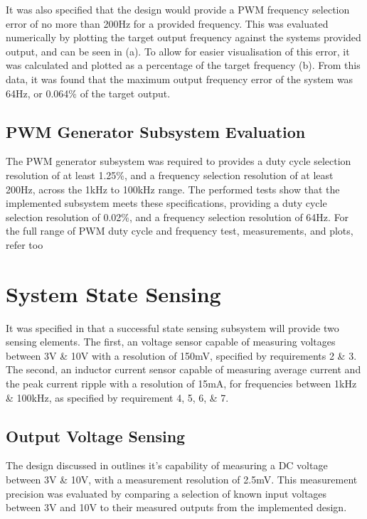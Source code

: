 It was also specified that the design would provide a PWM frequency selection error of no more than 200Hz for a provided frequency. This was evaluated numerically by plotting the target output frequency against the systems provided output, and can be seen in  (a). To allow for easier visualisation of this error, it was calculated and plotted as a percentage of the target frequency  (b). From this data, it was found that the maximum output frequency error of the system was 64Hz, or 0.064\% of the target output.\\

\subsection{PWM Generator Subsystem Evaluation}

The PWM generator subsystem was required to provides a duty cycle selection resolution of at least 1.25\%, and a frequency selection resolution of at least 200Hz, across the 1kHz to 100kHz range. The performed tests show that the implemented subsystem meets these specifications, providing a duty cycle selection resolution of 0.02\%, and a frequency selection resolution of 64Hz.  For the full range of PWM duty cycle and frequency test, measurements, and plots, refer too 


\section{System State Sensing}\label{S:current_sense_eval}

It was specified in  that a successful state sensing subsystem will provide two sensing elements. The first, an voltage sensor capable of measuring voltages between 3V \& 10V with a resolution of 150mV, specified by requirements 2 \& 3. The second, an inductor current sensor capable of measuring average current and the peak current ripple with a resolution of 15mA, for frequencies between 1kHz \& 100kHz, as specified by requirement 4, 5, 6, \& 7.

\subsection{Output Voltage Sensing}

The design discussed in  outlines it's capability of measuring a DC voltage between 3V \& 10V, with a measurement resolution of 2.5mV. This measurement precision was evaluated by comparing a selection of known input voltages between 3V and 10V to their measured outputs from the implemented design.\\


